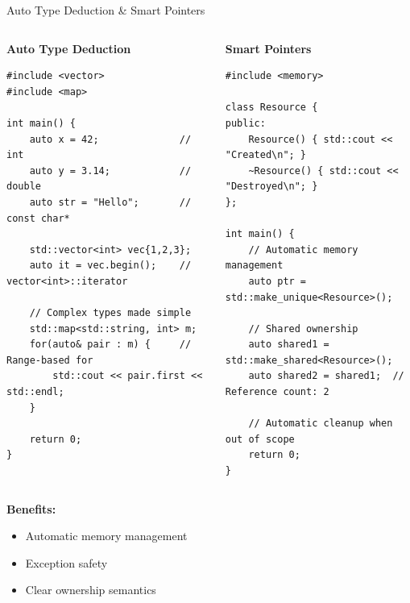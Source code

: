 \begin{frame}[fragile]{ Auto Type Deduction \& Smart Pointers}
	\begin{columns}
		\begin{column}{0.5\textwidth}
			\textbf{Auto Type Deduction}
			\begin{verbatim}
#include <vector>
#include <map>

int main() {
    auto x = 42;              // int
    auto y = 3.14;            // double
    auto str = "Hello";       // const char*

    std::vector<int> vec{1,2,3};
    auto it = vec.begin();    // vector<int>::iterator

    // Complex types made simple
    std::map<std::string, int> m;
    for(auto& pair : m) {     // Range-based for
        std::cout << pair.first << std::endl;
    }

    return 0;
}
			\end{verbatim}
		\end{column}
		\begin{column}{0.5\textwidth}
			\textbf{Smart Pointers}
			\begin{verbatim}
#include <memory>

class Resource {
public:
    Resource() { std::cout << "Created\n"; }
    ~Resource() { std::cout << "Destroyed\n"; }
};

int main() {
    // Automatic memory management
    auto ptr = std::make_unique<Resource>();

    // Shared ownership
    auto shared1 = std::make_shared<Resource>();
    auto shared2 = shared1;  // Reference count: 2

    // Automatic cleanup when out of scope
    return 0;
}
			\end{verbatim}
		\end{column}
	\end{columns}

	\vspace{0.5em}
	\textbf{Benefits:}
	\begin{itemize}
		\item Automatic memory management
		\item Exception safety
		\item Clear ownership semantics
	\end{itemize}
\end{frame}
